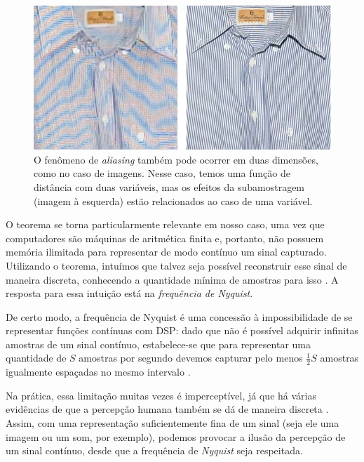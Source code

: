 \documentclass[12pt]{article}
\begin{document}
		\begin{figure}[!ht]
			\centering
			\includegraphics[width=16cm]{imgs/aliasing_image.jpg}
			\caption{\footnotesize {O fenômeno de \textit{aliasing} também pode ocorrer em duas dimensões, como no caso de imagens. Nesse caso, temos uma função de distância com duas variáveis, mas os efeitos da subamostragem (imagem à esquerda) estão relacionados ao caso de uma variável.}}
			\label{fig:aliasing2}
			\vspace{5mm}
		\end{figure}  
		
		O teorema se torna particularmente relevante em nosso caso, uma vez que computadores são máquinas de aritmética finita e, portanto, não possuem memória ilimitada para representar de modo contínuo um sinal capturado. Utilizando o teorema, intuímos que talvez seja possível reconstruir esse sinal de maneira discreta, conhecendo a quantidade mínima de amostras para isso \cite{Jerri-1977}. A resposta para essa intuição está na \textit{frequência de Nyquist}.
		
		De certo modo, a frequência de Nyquist é uma concessão à impossibilidade de se representar funções contínuas com DSP: dado que não é possível adquirir infinitas amostras de um sinal contínuo, estabelece-se que para representar uma quantidade de $S$ amostras por segundo devemos capturar pelo menos $\frac{1}{2}S$ amostras igualmente espaçadas no mesmo intervalo \cite{Grenander-1959}.
		
		Na prática, essa limitação muitas vezes é imperceptível, já que há várias evidências de que a percepção humana também se dá de maneira discreta \cite{VanRullen-2003}. Assim, com uma representação suficientemente fina de um sinal (seja ele uma imagem ou um som, por exemplo), podemos provocar a ilusão da percepção de um sinal contínuo, desde que a frequência de \textit{Nyquist} seja respeitada. 
		
\end{document}
